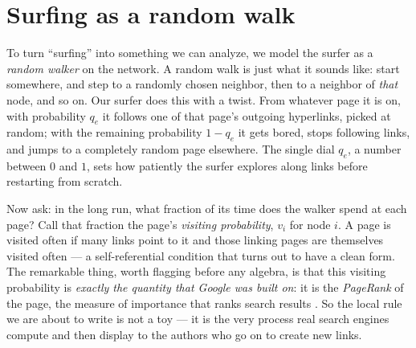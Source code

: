 \section{Surfing as a random walk}

To turn ``surfing'' into something we can analyze, we model the surfer as a
\emph{random walker} on the network. A random walk is just what it sounds like:
start somewhere, and step to a randomly chosen neighbor, then to a neighbor of
\emph{that} node, and so on. Our surfer does this with a twist. From whatever
page it is on, with probability $q_e$ it follows one of that page's outgoing
hyperlinks, picked at random; with the remaining probability $1-q_e$ it gets
bored, stops following links, and jumps to a completely random page elsewhere.
The single dial $q_e$, a number between $0$ and $1$, sets how patiently the
surfer explores along links before restarting from scratch.

Now ask: in the long run, what fraction of its time does the walker spend at
each page? Call that fraction the page's \emph{visiting probability}, $v_i$ for
node $i$. A page is visited often if many links point to it and those linking
pages are themselves visited often --- a self-referential condition that turns
out to have a clean form. The remarkable thing, worth flagging before any
algebra, is that this visiting probability is \emph{exactly the quantity that
Google was built on}: it is the \emph{PageRank} of the page, the measure of
importance that ranks search results \citep{brin1998}. So the local rule we are
about to write is not a toy --- it is the very process real search engines compute
and then display to the authors who go on to create new links.

